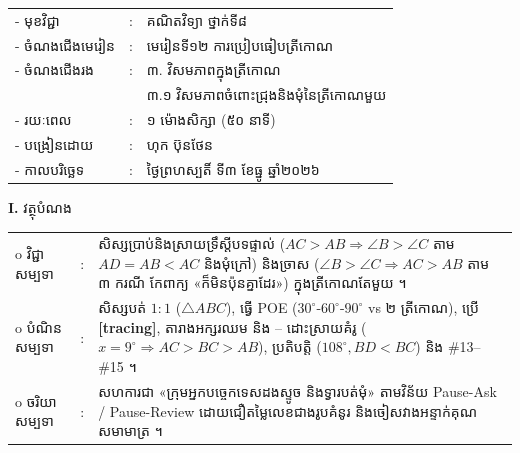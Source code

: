 \documentclass[a4paper,10pt]{article}
\newcommand{\wcirc}{{\CourierBullet\fontsize{9.5pt}{11pt}\selectfont o}}
\newcommand{\en}[1]{{\TimesEn #1}}
\newcommand{\cnum}[1]{{\fontsize{10.5pt}{12pt}\selectfont\ding{\numexpr181+#1\relax}}\hspace{0.2em}}
\newcommand{\tri}[1]{\ensuremath{\triangle #1}}
\newcommand{\ang}[1]{\ensuremath{\angle #1}}
\begin{document}
{\renewcommand{\arraystretch}{0.95}
\hspace*{4.05cm}%
\begin{tabular}{@{}l l l@{}}
  - \hspace{0.35cm} មុខវិជ្ជា & : & គណិតវិទ្យា ថ្នាក់ទី៨ \\
  - \hspace{0.35cm} ចំណងជើងមេរៀន & : & មេរៀនទី១២ ការប្រៀបធៀបត្រីកោណ \\
  - \hspace{0.35cm} ចំណងជើងរង & : & ៣. វិសមភាពក្នុងត្រីកោណ \\
  & & ៣.១ វិសមភាពចំពោះជ្រុងនិងមុំនៃត្រីកោណមួយ \\
  - \hspace{0.35cm} រយៈពេល & : & ១ ម៉ោងសិក្សា (៥០ នាទី) \\
  - \hspace{0.35cm} បង្រៀនដោយ & : & ហុក ប៊ុនថែន \\
  - \hspace{0.35cm} កាលបរិច្ឆេទ & : & ថ្ងៃព្រហស្បតិ៍ ទី៣ ខែធ្នូ ឆ្នាំ២០២៦ \\
\end{tabular}

\vspace{1pt}

\textbf{I.} {\muol វត្ថុបំណង}\\[1pt]
\hspace*{0.55cm}%
\begin{tabular}{@{}l l L{14.2cm}@{}}
  \wcirc \hspace{0.25cm} វិជ្ជាសម្បទា & : & សិស្សប្រាប់និងស្រាយទ្រឹស្ដីបទផ្ទាល់ ($AC>AB\Rightarrow\ang{B}>\ang{C}$ តាម $AD=AB<AC$ និងមុំក្រៅ) និងច្រាស ($\ang{B}>\ang{C}\Rightarrow AC>AB$ តាម ៣ ករណី កែពាក្យ «ក៏មិនប៉ុនគ្នាដែរ») ក្នុងត្រីកោណតែមួយ ។ \\
  \wcirc \hspace{0.25cm} បំណិនសម្បទា & : & សិស្សបត់ $1:1$ ($\tri{ABC}$), ធ្វើ POE ($30^\circ\text{-}60^\circ\text{-}90^\circ$ vs ២ ត្រីកោណ), ប្រើ \textbf{[tracing]}, តារាងអក្សរឈម និង \cnum{1}--\cnum{5} ដោះស្រាយគំរូ ($x=9^\circ\Rightarrow AC>BC>AB$), ប្រតិបត្តិ ($108^\circ, BD<BC$) និង \#13--\#15 ។ \\
  \wcirc \hspace{0.25cm} ចរិយាសម្បទា & : & សហការជា «ក្រុមអ្នកបច្ចេកទេសដងស្ទូច និងទ្វារបត់មុំ» តាមវិន័យ \en{Pause-Ask / Pause-Review} ដោយជឿតម្លៃលេខជាងរូបគំនូរ និងចៀសវាងអន្ទាក់គុណសមាមាត្រ ។ \\
\end{tabular}

}
\end{document}
